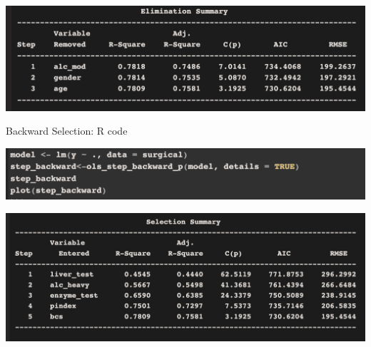 \documentclass[compress]{beamer}
\begin{document}
\begin{frame}

\includegraphics[scale=.42]{figs8/Screen Shot5.png} \\


\end{frame}




\begin{frame}{Backward Selection: R code}


\vspace{.1in}
{
\includegraphics[scale=.6]{figs8/RScreen Shot2.png} }
\end{frame}



\begin{frame}

\includegraphics[scale=.42]{figs8/Screen Shot4.png} \\


\end{frame}
\end{document}

